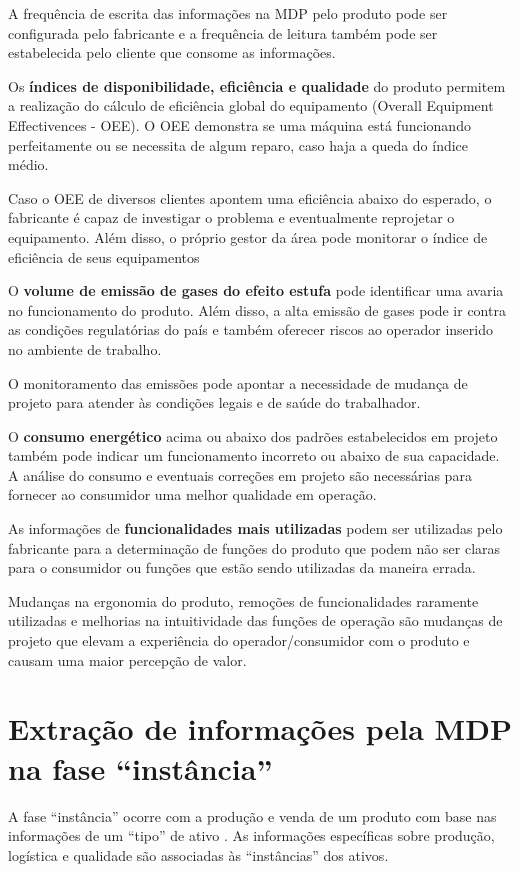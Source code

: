 	A frequência de escrita das informações na MDP pelo produto pode ser configurada pelo fabricante e a frequência de leitura também pode ser estabelecida pelo cliente que consome as informações.
	
	Os \textbf{índices de disponibilidade, eficiência e qualidade} do produto permitem a realização do cálculo de eficiência global do equipamento (Overall Equipment Effectivences - OEE). O OEE demonstra se uma máquina está funcionando perfeitamente ou se necessita de algum reparo, caso haja a queda do índice médio.
	
	Caso o OEE de diversos clientes apontem uma eficiência abaixo do esperado, o fabricante é capaz de investigar o problema e eventualmente reprojetar o equipamento. Além disso, o próprio gestor da área pode monitorar o índice de eficiência de seus equipamentos
	
	O \textbf{volume de emissão de gases do efeito estufa} pode identificar uma avaria no funcionamento do produto. Além disso, a alta emissão de gases pode ir contra as condições regulatórias do país e também oferecer riscos ao operador inserido no ambiente de trabalho.
	
	O monitoramento das emissões pode apontar a necessidade de mudança de projeto para atender às condições legais e de saúde do trabalhador.
	
	O \textbf{consumo energético} acima ou abaixo dos padrões estabelecidos em projeto também pode indicar um funcionamento incorreto ou abaixo de sua capacidade. A análise do consumo e eventuais correções em projeto são necessárias para fornecer ao consumidor uma melhor qualidade em operação.
	
	As informações de \textbf{funcionalidades mais utilizadas} podem ser utilizadas pelo fabricante para a determinação de funções do produto que podem não ser claras para o consumidor ou funções que estão sendo utilizadas da maneira errada.
	
	Mudanças na ergonomia do produto, remoções de funcionalidades raramente utilizadas e melhorias na intuitividade das funções de operação são mudanças de projeto que elevam a experiência do operador/consumidor com o produto e causam uma maior percepção de valor.


\section{Extração de informações pela MDP na fase ``instância''}

	A fase ``instância'' ocorre com a produção e venda de um produto com base nas informações de um ``tipo'' de ativo \cite{bader2019aas}. As informações específicas sobre produção, logística e qualidade são associadas às ``instâncias'' dos ativos.
	
